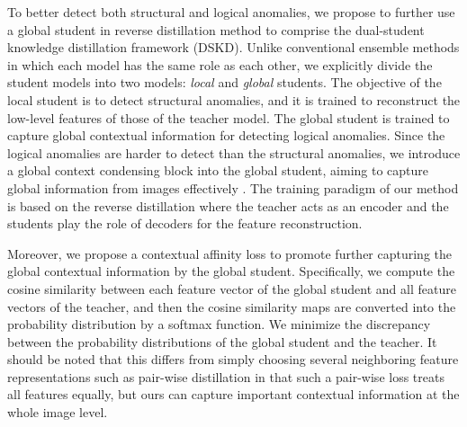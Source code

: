 \documentclass[10pt,twocolumn,letterpaper]{article}
\begin{document}
To better detect both structural and logical anomalies, we propose to further use a global student in reverse distillation method \cite{deng2022anomaly} to comprise the dual-student knowledge distillation framework (DSKD). Unlike conventional ensemble methods \cite{dietterich2000ensemble,rokach2010ensemble,lakshminarayanan2017simple} in which each model has the same role as each other, we explicitly divide the student models into two models: {\it local} and {\it global} students. The objective of the local student is to detect structural anomalies, and it is trained to reconstruct the low-level features of those of the teacher model. The global student is trained to capture global contextual information for detecting logical anomalies. Since the logical anomalies are harder to detect than the structural anomalies, we introduce a global context condensing block into the global student, aiming to capture global information from images effectively \cite{liu2020towards,bergmann2022beyond}. The training paradigm of our method is based on the reverse distillation \cite{deng2022anomaly} where the teacher acts as an encoder and the students play the role of decoders for the feature reconstruction.

Moreover, we propose a contextual affinity loss to promote further capturing the global contextual information by the global student. Specifically, we compute the cosine similarity between each feature vector of the global student and all feature vectors of the teacher, and then the cosine similarity maps are converted into the probability distribution by a softmax function. We minimize the discrepancy between the probability distributions of the global student and the teacher. It should be noted that this differs from simply choosing several neighboring feature representations such as pair-wise distillation \cite{liu2019structured} in that such a pair-wise loss treats all features equally, but ours can capture important contextual information at the whole image level.
\end{document}
